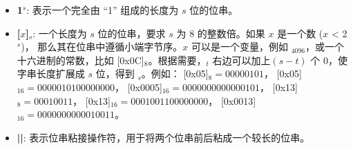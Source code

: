 \documentclass[main\_\_CN.tex]{subfiles}
\begin{document}
\begin{itemize}

    \item {\bfseries 1\begin{math}^s\end{math}}:
        表示一个完全由 “1” 组成的长度为 \begin{math}s\end{math} 位的位串。

    \item {\bfseries [\begin{math}x\end{math}]\begin{math}_{s}\end{math}}:
       一个长度为 \begin{math}s\end{math} 位的位串，要求 \begin{math}s\end{math} 为 8 的整数倍。如果 \begin{math}x\end{math} 是一个数 (\begin{math}x\end{math} < 2\begin{math}^s\end{math})， 那么其在位串中遵循小端字节序。\begin{math}x\end{math} 可以是一个变量，例如 \begin{math}[Y]_{4096}\end{math}，或一个十六进制的常数，比如 [0x0C]\begin{math}_{8}\end{math}。根据需要，\begin{math}[x]_{t}\end{math} 右边可以加上\begin{math} (s-t) \end{math} 个 0，使字串长度扩展成 \begin{math}s\end{math} 位，得到 \begin{math}[x]_{s}\end{math}。例如：
       [0x05]\begin{math}_{8} = 00000101\end{math}，
       [0x05]\begin{math}_{16} = 00000101 00000000\end{math}，
       [0x0005]\begin{math}_{16} = 00000000 00000101\end{math}，
       [0x13]\begin{math}_{8} = 00010011\end{math}，
       [0x13]\begin{math}_{16} = 00010011 00000000\end{math}，
       [0x0013]\begin{math}_{16} = 00000000 00010011\end{math}。

    \item {\bfseries ||}:
       表示位串粘接操作符，用于将两个位串前后粘成一个较长的位串。
\end{itemize}
\end{document}
